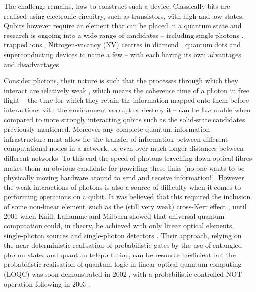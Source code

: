 \documentclass[../Thesis-IJspeert.tex]{subfiles}
\begin{document}
The challenge remains, how to construct such a device.  Classically bits are realised using electronic circuitry, such as transistors, with high and low states.  Qubits however require an element that can be placed  in a quantum state and research is ongoing into a wide range of candidates -- including single photons \cite{kok16,holleczek15b, obrien07}, trapped ions \cite{eltony16, harty14, monz11}, Nitrogen-vacancy (NV) centres in diamond \cite{fuchs11,nizovtsev05, neumann08}, quantum dots \cite{michler17,feng03,imamoglu99} and superconducting devices \cite{wallraff04, leek10, benjamin15, wendin17} to name a few -- with each having its own advantages and disadvantages.

Consider photons, their nature is such that the processes through which they interact are relatively weak \cite{quantumOpticsAnIntroduction06}, which means the coherence time of a photon in free flight -- the time for which they retain the information mapped onto them before interactions with the environment corrupt or destroy it -- can be favourable when compared to more strongly interacting qubits such as the solid-state candidates previously mentioned.  Moreover any complete quantum information infrastructure must allow for the transfer of information between different computational nodes in a network, or even over much longer distances between different networks.  To this end the speed of photons travelling down optical fibres makes them an obvious candidate for providing these links \cite{duan01} (no one wants to be physically moving hardware around to send and receive information!).  However the weak interactions of photons is also a source of difficulty when it comes to performing operations on a qubit.  It was believed that this required the inclusion of some non-linear element, such as the (still very weak) cross-Kerr effect \cite{kok02,lin09,sheng08,clausen02}, until 2001 when Knill, Laflamme and Milburn showed that universal quantum computation could, in theory, be achieved with only linear optical elements, single-photon sources and single-photon detectors \cite{knill01}.  Their approach, relying on the near deterministic realisation of probabilistic gates by the use of entangled photon states and quantum teleportation, can be resource inefficient but the probabilistic realisation of quantum logic in linear optical quantum computing (LOQC) was soon demonstrated in 2002 \cite{pittman02}, with a probabilistic controlled-NOT operation following in 2003 \cite{obrien03}.  
\end{document}
